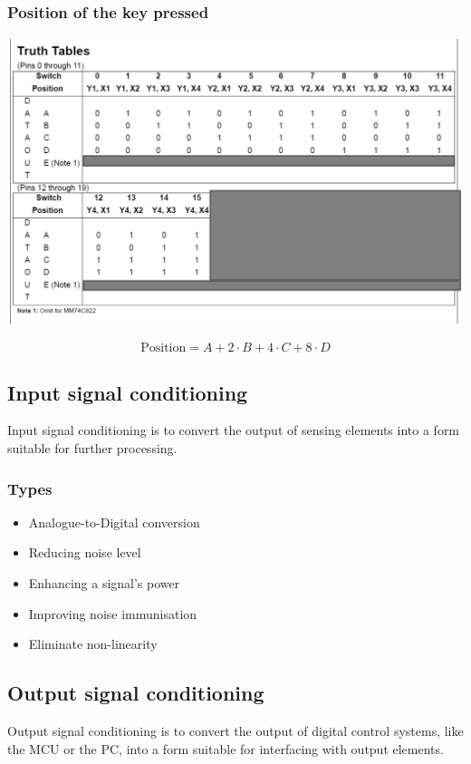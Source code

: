 \documentclass[11pt]{article}
\begin{document}
\subsubsection{Position of the key pressed}
\label{sec:org69e2d61}
\begin{center}
\includegraphics[width=.9\linewidth]{./images/74c922-keypad-encoder-truth-table.png}
\end{center}
\[\text{Position} = A + 2 \cdot B + 4 \cdot C + 8 \cdot D\]

 \newpage
\subsection{Input signal conditioning}
\label{sec:org81135e9}
Input signal conditioning is to convert the output of sensing elements into a form suitable for further processing.
\subsubsection{Types}
\label{sec:orgbcd3a27}
\begin{itemize}
\item Analogue-to-Digital conversion
\item Reducing noise level
\item Enhancing a signal's power
\item Improving noise immunisation
\item Eliminate non-linearity
\end{itemize}
\subsection{Output signal conditioning}
\label{sec:org1f303bc}
Output signal conditioning is to convert the output of digital control systems, like the MCU or the PC, into a form suitable for interfacing with output elements.
\end{document}
